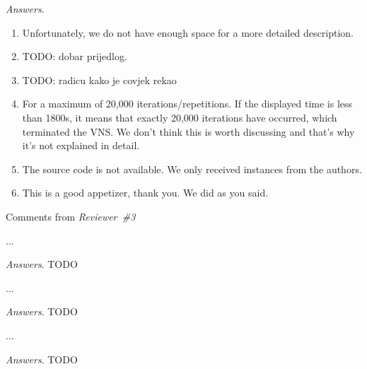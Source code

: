 \documentclass [11pt]{scrartcl}
\begin{document}
\emph{Answers}. 
\begin{enumerate}
	
\item Unfortunately, we do not have enough space for a more detailed description.
\item TODO: dobar prijedlog.
\item TODO: radicu kako je covjek rekao
\item For a maximum of 20,000 iterations/repetitions. If the displayed time is less than 1800s, it means that exactly 20,000 iterations have occurred, which terminated the VNS. We don't think this is worth discussing and that's why it's not explained in detail.
\item The source code is not available. We only received instances from the authors.
\item This is a good appetizer, thank you. We did as you said. 
 
\end{enumerate}

\begin{center} Comments from \textit{Reviewer\ \#3}
	
\end{center}


\begin{leftbar}
...
	
\end{leftbar}

\emph{Answers}. TODO 


\begin{leftbar}
...
	
\end{leftbar}

\emph{Answers}. TODO 


\begin{leftbar}
...
	
\end{leftbar}

\emph{Answers}. TODO 
 






\end{document}
